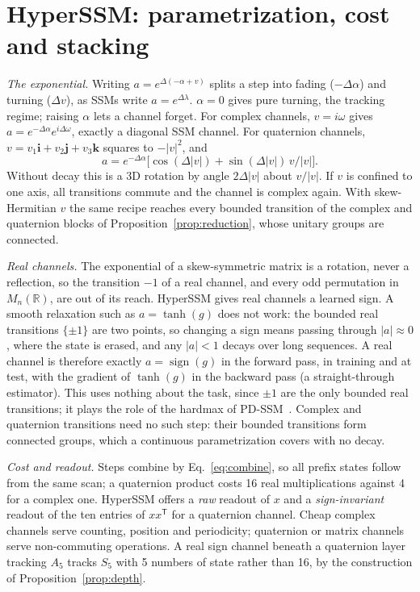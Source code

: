 \documentclass[aps,prx,reprint,superscriptaddress,longbibliography,nofootinbib,floatfix]{revtex4-2}
\newcommand{\RR}{\mathbb{R}}
\theoremstyle{plain}
\theoremstyle{definition}
\begin{document}
\section{HyperSSM: parametrization, cost and stacking}\label{sm:hyperssm}

\emph{The exponential.} Writing $a=e^{\Delta(-\alpha+v)}$ splits a step into
fading ($-\Delta\alpha$) and turning ($\Delta v$), as SSMs write
$a=e^{\Delta\lambda}$. $\alpha=0$ gives pure turning, the tracking regime;
raising $\alpha$ lets a channel forget. For complex channels, $v=i\omega$
gives $a=e^{-\Delta\alpha}e^{i\Delta\omega}$, exactly a diagonal SSM channel.
For quaternion channels, $v=v_1\mathbf i+v_2\mathbf j+v_3\mathbf k$ squares
to $-|v|^2$, and
\begin{equation}
a = e^{-\Delta\alpha}\bigl[\cos(\Delta|v|) + \sin(\Delta|v|)\,v/|v|\bigr].
\label{eq:quat}
\end{equation}
Without decay this is a 3D rotation by angle $2\Delta|v|$ about $v/|v|$. If
$v$ is confined to one axis, all transitions commute and the channel is
complex again. With skew-Hermitian $v$ the same recipe reaches every bounded
transition of the complex and quaternion blocks of
Proposition~\ref{prop:reduction}, whose unitary groups are connected.

\emph{Real channels.} The exponential of a skew-symmetric matrix is a
rotation, never a reflection, so the transition $-1$ of a real channel, and
every odd permutation in $M_n(\RR)$, are out of its reach. HyperSSM gives
real channels a learned sign. A smooth relaxation such as
$a=\tanh(g)$ does not work: the bounded real transitions $\{\pm1\}$ are two
points, so changing a sign means passing through $|a|\approx0$, where the
state is erased, and any $|a|<1$ decays over long sequences. A real channel
is therefore exactly $a=\operatorname{sign}(g)$ in the forward pass, in
training and at test, with the gradient of $\tanh(g)$ in the backward pass
(a straight-through estimator). This uses nothing about the task, since
$\pm1$ are the only bounded real transitions; it plays the role of the
hardmax of PD-SSM~\cite{pdssm}. Complex and quaternion transitions need no
such step: their bounded transitions form connected groups, which a
continuous parametrization covers with no decay.

\emph{Cost and readout.} Steps combine by Eq.~\eqref{eq:combine}, so all
prefix states follow from the same scan; a quaternion product costs 16 real
multiplications against 4 for a complex one.
HyperSSM offers a \emph{raw} readout of $x$ and a \emph{sign-invariant}
readout of the ten entries of $xx^{\mathsf T}$ for a quaternion channel. Cheap complex channels serve
counting, position and periodicity; quaternion or matrix channels serve
non-commuting operations. A real sign channel beneath a quaternion layer
tracking $A_5$ tracks $S_5$ with 5 numbers of state rather than 16, by the
construction of Proposition~\ref{prop:depth}.
\end{document}
